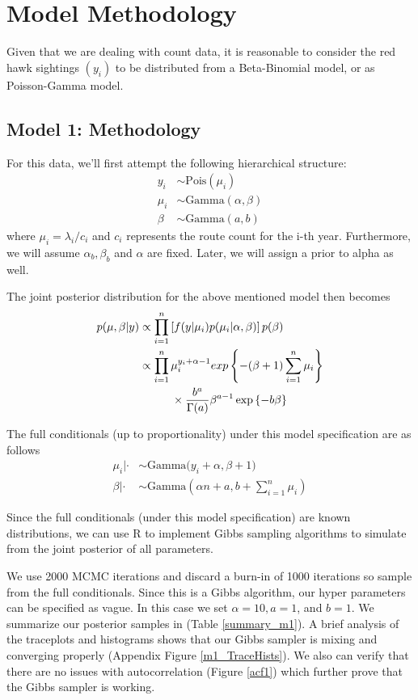 \documentclass{asaproc}
\newcommand{\prodi}{\prod_{i=1}^n}
\newcommand{\sumi}{\sum_{i=1}^n}
\newcommand\tab[1][1cm]{\hspace*{#1}}
\newcommand{\Pois}{\text{Pois}}
\newcommand{\Gam}{\text{Gamma}}
\begin{document}
\section{Model Methodology}
Given that we are dealing with count data, it is reasonable to consider the red hawk sightings $(y_i)$ to be distributed from a Beta-Binomial model, or as Poisson-Gamma model. 
\subsection{Model 1: Methodology}
For this data, we'll first attempt the following hierarchical structure:
\begin{align*}
    y_i &\sim \Pois(\mu_i)\\
    \mu_i &\sim \Gam(\alpha, \beta)\\
    \beta &\sim \Gam(a, b) 
\end{align*}
where $\mu_i = \lambda_i/c_i$ and $c_i$ represents the route count for the i-th year. Furthermore, we will assume $\alpha_b, \beta_b$ and $\alpha$ are fixed. Later, we will assign a prior to alpha as well.

The joint posterior distribution for the above mentioned model then becomes
\begin{align*}
    p(\mu, \beta | y) &\propto \prodi \left[ f(y|\mu_i) p(\mu_i|\alpha,\beta) \right]p(\beta)\\
    &\propto \prodi \mu_i^{y_i + \alpha -1} exp\left\{-(\beta + 1) \sumi \mu_i \right\}
    \\
    &\tab \times\frac{b^a}{\Gamma(a)} \beta^{a-1} \exp\left\{-b\beta\right\}
\end{align*}

The full conditionals (up to proportionality) under this model specification are as follows
\begin{align*}
    \mu_i|\cdot &\sim \Gam\Big(y_i + \alpha, \beta + 1\Big)\\
    \beta|\cdot &\sim \Gam\left(\alpha n + a, b + \sumi \mu_i\right)
\end{align*}

Since the full conditionals (under this model specification) are known distributions, we can use R to implement Gibbs sampling algorithms to simulate from the joint posterior of all parameters.

We use 2000 MCMC iterations and discard  a burn-in of 1000 iterations so sample from the full conditionals. Since this is a Gibbs algorithm, our hyper parameters can be specified as vague. In this case we set $\alpha = 10, a = 1$, and $b = 1$. We summarize our posterior samples in (Table \ref{summary_m1}). A brief analysis of the traceplots and histograms shows that our Gibbs sampler is mixing and converging properly (Appendix Figure \ref{m1_TraceHists}). We also can verify that there are no issues with autocorrelation (Figure \ref{acf1}) which further prove that the Gibbs sampler is working.
\end{document}
